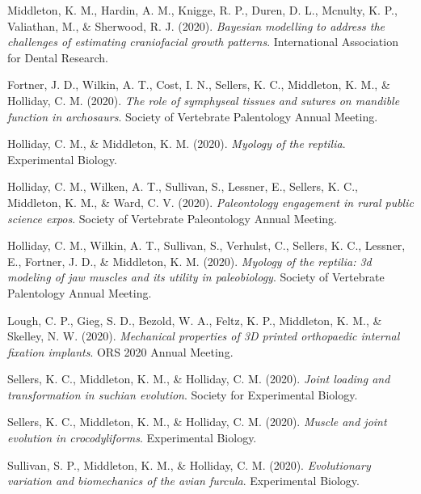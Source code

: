 \documentclass[11pt, a4paper]{awesome-cv}
\begin{document}
\begingroup
\setlength{\parindent}{-0.5in}
\setlength{\leftskip}{0.5in}

\hypertarget{refs_abstracts}{}
\leavevmode\hypertarget{ref-Middleton2020-ye}{}%
Middleton, K. M., Hardin, A. M., Knigge, R. P., Duren, D. L., Mcnulty,
K. P., Valiathan, M., \& Sherwood, R. J. (2020). \emph{Bayesian
modelling to address the challenges of estimating craniofacial growth
patterns}. International Association for Dental Research.

\leavevmode\hypertarget{ref-Fortner2020-qa}{}%
Fortner, J. D., Wilkin, A. T., Cost, I. N., Sellers, K. C., Middleton,
K. M., \& Holliday, C. M. (2020). \emph{The role of symphyseal tissues
and sutures on mandible function in archosaurs}. Society of Vertebrate
Palentology Annual Meeting.

\leavevmode\hypertarget{ref-Holliday2020-ua}{}%
Holliday, C. M., \& Middleton, K. M. (2020). \emph{Myology of the
reptilia}. Experimental Biology.

\leavevmode\hypertarget{ref-Holliday2020-vt}{}%
Holliday, C. M., Wilken, A. T., Sullivan, S., Lessner, E., Sellers, K.
C., Middleton, K. M., \& Ward, C. V. (2020). \emph{Paleontology
engagement in rural public science expos}. Society of Vertebrate
Paleontology Annual Meeting.

\leavevmode\hypertarget{ref-Holliday2020-to}{}%
Holliday, C. M., Wilkin, A. T., Sullivan, S., Verhulst, C., Sellers, K.
C., Lessner, E., Fortner, J. D., \& Middleton, K. M. (2020).
\emph{Myology of the reptilia: 3d modeling of jaw muscles and its
utility in paleobiology}. Society of Vertebrate Palentology Annual
Meeting.

\leavevmode\hypertarget{ref-Lough2020-qg}{}%
Lough, C. P., Gieg, S. D., Bezold, W. A., Feltz, K. P., Middleton, K.
M., \& Skelley, N. W. (2020). \emph{Mechanical properties of 3D printed
orthopaedic internal fixation implants}. ORS 2020 Annual Meeting.

\leavevmode\hypertarget{ref-Sellers2020-gf}{}%
Sellers, K. C., Middleton, K. M., \& Holliday, C. M. (2020). \emph{Joint
loading and transformation in suchian evolution}. Society for
Experimental Biology.

\leavevmode\hypertarget{ref-Sellers2020-lz}{}%
Sellers, K. C., Middleton, K. M., \& Holliday, C. M. (2020).
\emph{Muscle and joint evolution in crocodyliforms}. Experimental
Biology.

\leavevmode\hypertarget{ref-Sullivan2020-jk}{}%
Sullivan, S. P., Middleton, K. M., \& Holliday, C. M. (2020).
\emph{Evolutionary variation and biomechanics of the avian furcula}.
Experimental Biology.
\end{document}
